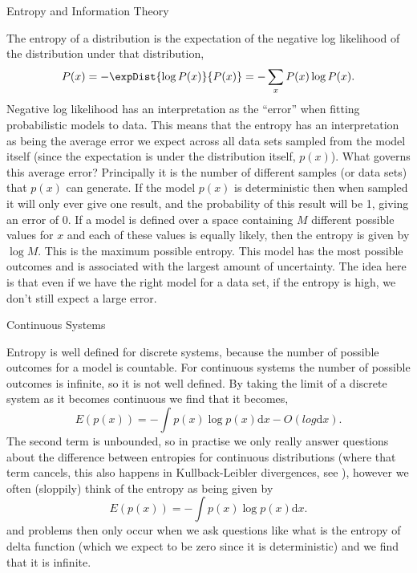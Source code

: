 \begin{boxfloat}
\caption{Entropy and Information Theory}\label{box:entropy}

The entropy of a distribution is the expectation of the negative log likelihood of the distribution under that distribution,
\[
P(x) = -\expDist{\log P(x)}{P(x)} = -\sum_{x} P(x) \log P(x).
\]
Negative log likelihood has an interpretation as the ``error'' when
fitting probabilistic models to data. This means that the entropy has
an interpretation as being the average error we expect across all data
sets sampled from the model itself (since the expectation is under the
distribution itself, $p(x)$). What governs this average error?
Principally it is the number of different samples (or data sets) that
$p(x)$ can generate. If the model $p(x)$ is deterministic then when
sampled it will only ever give one result, and the probability of this
result will be 1, giving an error of 0. If a model is defined over a
space containing $M$ different possible values for $x$ and each of
these values is equally likely, then the entropy is given by $\log
M$. This is the maximum possible entropy. This model has the most
possible outcomes and is associated with the largest amount of
uncertainty. The idea here is that even if we have the right model for
a data set, if the entropy is high, we don't still expect a large
error.

Continuous Systems

Entropy is well defined for discrete systems, because the number of possible outcomes for a model is countable. For continuous systems the number of possible outcomes is infinite, so it is not well defined. By taking the limit of a discrete system as it becomes continuous we find that it becomes, 
\[
E(p(x)) = -\int p(x) \log p(x) \text{d}x - O(log \text{d}x).
\]
The second term is unbounded, so in practise we only really answer questions about the difference between entropies for continuous distributions (where that term cancels, this also happens in Kullback-Leibler divergences, see ), however we often (sloppily) think of the entropy as being given by
\[
E(p(x)) = -\int p(x) \log p(x) \text{d}x .
\]
and problems then only occur when we ask questions like what is the entropy of delta function (which we expect to be zero since it is deterministic) and we find that it is infinite.
\end{boxfloat}


